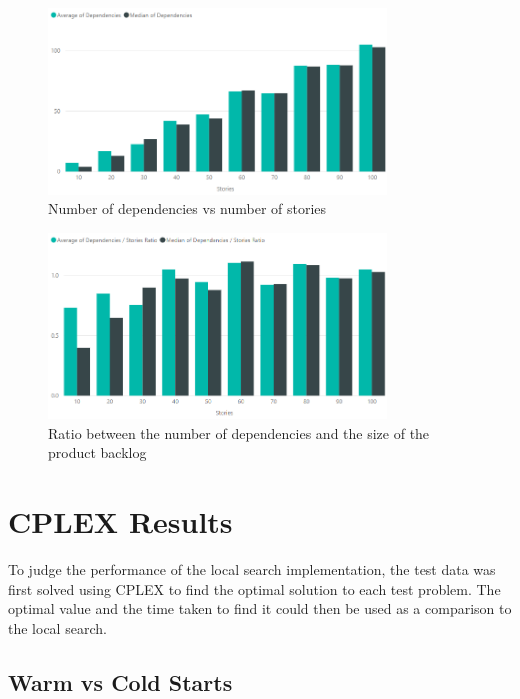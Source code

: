 \begin{figure}[h!]
    \centering
    \includegraphics[width=0.8\textwidth]{Figures/TestData/stories.png}
    \caption{Number of dependencies vs number of stories}
    \label{fig:stories}
\end{figure}

\begin{figure}[h!]
    \centering
    \includegraphics[width=0.8\textwidth]{Figures/TestData/dependencies_stories_ratio.png}
    \caption{Ratio between the number of dependencies and the size of the product backlog}
    \label{fig:dependencies_stories}
\end{figure}

\section{CPLEX Results}

To judge the performance of the local search implementation, the test data was first solved using CPLEX to find the optimal solution to each test problem. The optimal value and the time taken to find it could then be used as a comparison to the local search.

\subsection{Warm vs Cold Starts}

